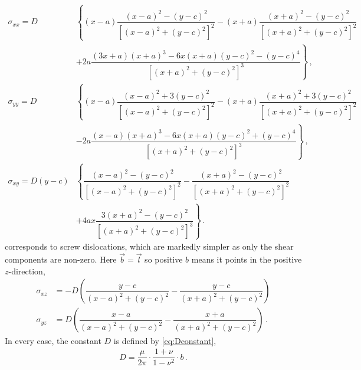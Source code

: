 \begin{subequations}\label{eq:imageStressAnalyticEdge2}
    \begin{align}
        \sigma_{xx} = D         & \left\{ (x - a) \dfrac{(x - a)^2 - (y - c)^2}{[(x - a)^2 + (y - c)^2]^2} -(x + a) \dfrac{(x + a)^2 - (y - c)^2}{[(x + a)^2 + (y - c)^2]^2} \right.     \\\nonumber
                                & \left. + 2 a \dfrac{(3 x + a) (x + a)^3 - 6 x (x + a) (y - c)^2 - (y - c)^4}{[(x + a)^2 + (y - c)^2]^3}\right\}\,,                                     \\
        \sigma_{yy} = D         & \left\{ (x - a) \dfrac{(x - a)^2 + 3 (y - c)^2}{[(x - a)^2 + (y - c)^2]^2} - (x + a) \dfrac{(x + a)^2 + 3 (y - c)^2}{[(x + a)^2 + (y - c)^2]^2}\right. \\\nonumber
                                & \left. - 2 a \dfrac{(x - a) (x + a)^3 - 6 x (x + a) (y - c)^2 + (y - c)^4}{[(x + a)^2 + (y - c)^2]^3}\right\}\,,                                       \\
        \sigma_{xy} = D (y - c) & \left\{\dfrac{(x - a)^2 - (y - c)^2}{[(x - a)^2 + (y - c)^2]^2} - \dfrac{(x + a)^2 - (y - c)^2}{[(x + a)^2 + (y - c)^2]^2} \right.                     \\\nonumber
                                & \left. + 4 a x \dfrac{3 (x + a)^2 - (y - c)^2}{[(x + a)^2 + (y - c)^2]^3}\right\}\,.
    \end{align}
\end{subequations}
 corresponds to screw dislocations, which are markedly simpler as only the shear components are non-zero. Here $\vec{b} = \vec{l}$ so positive $b$ means it points in the positive $z$-direction,
\begin{subequations}\label{eq:imageStressAnalyticScrew}
    \begin{align}
        \sigma_{xz} & = -D \left(\dfrac{y - c}{(x - a)^2 + (y - c)^2} - \dfrac{y - c}{(x + a)^2 + (y - c)^2}\right)   \\
        \sigma_{yz} & = D \left(\dfrac{x - a}{(x - a)^2 + (y - c)^2} - \dfrac{x + a}{(x + a)^2 + (y - c)^2}\right)\,.
    \end{align}
\end{subequations}
In every case, the constant $D$ is defined by \cref{eq:Dconstant},
\begin{align}\label{eq:Dconstant}
    D = \dfrac{\mu}{2\pi} \cdot \dfrac{1+\nu}{1-\nu^2} \cdot b\,.
\end{align}
